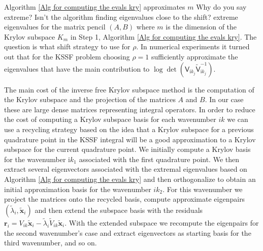     
Algorithm \ref{Alg for computing the evals kry} approximates $m$ {\color{red} Why do you say extreme? Isn't the algorithm finding eigenvalues close to the shift?}
extreme eigenvalues for the matrix pencil $(A,B)$ where $m$ is the dimension of the 
Krylov subspace $K_{m}$ in Step 1, Algorithm \ref{Alg for computing the evals kry}. The question is what shift strategy to use for $\rho$. In numerical experiments it turned
out that for the KSSF problem choosing $\rho=1$ sufficiently approximate the eigenvalues that have the main contribution to $\log\det(\mathsf{V}_{\mathrm{i}k_{j}}\tilde{\mathsf{V}}_{\mathrm{i}k_{j}}^{-1}) $.

The main cost of the inverse free Krylov subspace method is the computation of the Krylov subspace and the projection of the matrices $A$ and $B$. In our case these are large dense matrices representing
integral operators. In order to reduce the cost of computing a Krylov subspace basis for each wavenumber $ik$ we can use a recycling strategy based on the idea that a Krylov subspace for a previous quadrature
point in the KSSF integral will be a good approximation to a Krylov subspace for the current quadrature point. We initially compute a Krylov basis for the wavenumber $\mathrm{i}k_{1}$ associated with the first
quadrature point. We then extract several eigenvectors associated with the extremal eigenvalues based on Algorithm \ref{Alg for computing the evals kry} and then orthogonalize to obtain an initial approximation
basis for the wavenumber $ik_2$. For this wavenumber we project the matrices onto the recycled basis, compute approximate eigenpairs $(\tilde{\lambda}_i, \tilde{\mathbf{x}}_i)$ and then extend the subspace
basis with the residuals $\boldsymbol{r}_i = V_{ik}\tilde{\boldsymbol{x}}_i - \tilde{\lambda}_i\tilde{V}_{ik}\tilde{\boldsymbol{x}}_i$. With the extended subspace we recompute the eigenpairs for the second wavenumber's
case and extract eigenvectors as starting basis for the third wavenumber, and so on.


